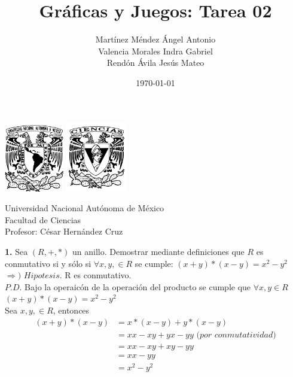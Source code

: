 \documentclass[12pt]{article}
\title{\textbf{Gráficas y Juegos: Tarea 02}}
\author{Martínez Méndez Ángel Antonio\\Valencia Morales Indra Gabriel\\Rendón Ávila Jesús Mateo}
\date{\today}
\begin{document}
\maketitle
\begin{center}
\vspace{3cm}
\includegraphics[width=0.195\textwidth]{Escudo.png}
\hspace{0.5cm}
\includegraphics[width=0.2\textwidth]{logo_ciencias.png}
\end{center}
\begin{center}
    \vspace{1cm}
    Universidad Nacional Autónoma de México\\
    Facultad de Ciencias\\
    Profesor: César Hernández Cruz\\
\end{center}

\newpage

%
%
\textbf{1.} Sea $(R, +, \ast)$ un anillo. Demostrar mediante definiciones que $R$ es conmutativo si y sólo si
$\forall x, y, \in R$ se cumple: $(x + y) \ast (x - y) = x^2 - y^2$\\

$\Longrightarrow)$ $Hipotesis$. R es conmutativo.\\

$P.D$. Bajo la operaicón de la operación del producto se cumple que $\forall x, y \in R$ $(x + y) \ast (x - y) = x^2 - y^2$\\

Sea $x, y, \in R$, entonces\\

\begin{align*}
    (x + y) \ast (x - y) &= x \ast (x - y) + y \ast (x - y)\\
    &= xx -xy +yx -yy \textit{ (por conmutatividad)}\\
    &= xx -xy +xy -yy\\
    &= xx - yy\\
    &= x^2 -y^2\\
\end{align*}
\end{document}
